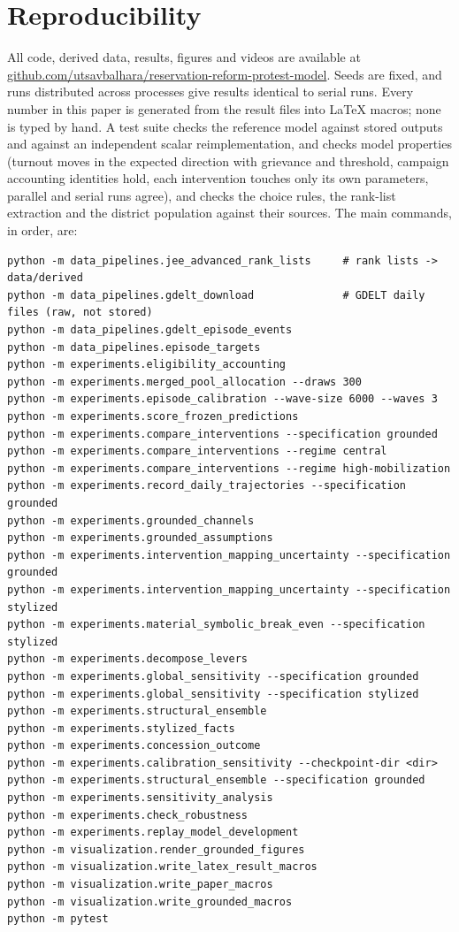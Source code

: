 \documentclass[11pt,a4paper]{article}
\begin{document}
\section{Reproducibility}
\label{sec:reproducibility}
All code, derived data, results, figures and videos are available at \href{https://github.com/utsavbalhara/reservation-reform-protest-model}{github.com/utsavbalhara/\allowbreak reservation-reform-protest-model}. Seeds are fixed, and runs distributed across processes give results identical to serial runs. Every number in this paper is generated from the result files into LaTeX macros; none is typed by hand. A test suite checks the reference model against stored outputs and against an independent scalar reimplementation, and checks model properties (turnout moves in the expected direction with grievance and threshold, campaign accounting identities hold, each intervention touches only its own parameters, parallel and serial runs agree), and checks the choice rules, the rank-list extraction and the district population against their sources. The main commands, in order, are:
\begin{small}
\begin{verbatim}
python -m data_pipelines.jee_advanced_rank_lists     # rank lists -> data/derived
python -m data_pipelines.gdelt_download              # GDELT daily files (raw, not stored)
python -m data_pipelines.gdelt_episode_events
python -m data_pipelines.episode_targets
python -m experiments.eligibility_accounting
python -m experiments.merged_pool_allocation --draws 300
python -m experiments.episode_calibration --wave-size 6000 --waves 3
python -m experiments.score_frozen_predictions
python -m experiments.compare_interventions --specification grounded
python -m experiments.compare_interventions --regime central
python -m experiments.compare_interventions --regime high-mobilization
python -m experiments.record_daily_trajectories --specification grounded
python -m experiments.grounded_channels
python -m experiments.grounded_assumptions
python -m experiments.intervention_mapping_uncertainty --specification grounded
python -m experiments.intervention_mapping_uncertainty --specification stylized
python -m experiments.material_symbolic_break_even --specification stylized
python -m experiments.decompose_levers
python -m experiments.global_sensitivity --specification grounded
python -m experiments.global_sensitivity --specification stylized
python -m experiments.structural_ensemble
python -m experiments.stylized_facts
python -m experiments.concession_outcome
python -m experiments.calibration_sensitivity --checkpoint-dir <dir>
python -m experiments.structural_ensemble --specification grounded
python -m experiments.sensitivity_analysis
python -m experiments.check_robustness
python -m experiments.replay_model_development
python -m visualization.render_grounded_figures
python -m visualization.write_latex_result_macros
python -m visualization.write_paper_macros
python -m visualization.write_grounded_macros
python -m pytest
\end{verbatim}
\end{small}
\end{document}
